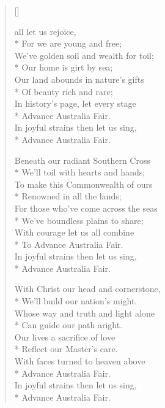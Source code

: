 \newHymn

\begin{verse}[\versewidth]
\begin{altverse}
 all let us rejoice,\\*
For we are young and free;\\
We've golden soil and wealth for toil;\\*
Our home is girt by sea;\\
Our land abounds in nature's gifts\\*
Of beauty rich and rare;\\
In history's page, let every stage\\*
Advance Australia Fair.\\
In joyful strains then let us sing,\\*
Advance Australia Fair.
\end{altverse}

\begin{altverse}
Beneath our radiant Southern Cross\\*
We'll toil with hearts and hands;\\
To make this Commonwealth of ours\\*
Renowned in all the lands;\\
For those who've come across the seas\\*
We've boundless plains to share;\\
With courage let us all combine\\*
To Advance Australia Fair.\\
In joyful strains then let us sing,\\*
Advance Australia Fair.
\end{altverse}

\begin{altverse}
With Christ our head and cornerstone,\\*
We'll build our nation's might.\\
Whose way and truth and light alone\\*
Can guide our path aright.\\
Our lives a sacrifice of love\\*
Reflect our Master's care.\\
With faces turned to heaven above\\*
Advance Australia Fair.\\
In joyful strains then let us sing,\\*
Advance Australia Fair.
\end{altverse}

\end{verse}

